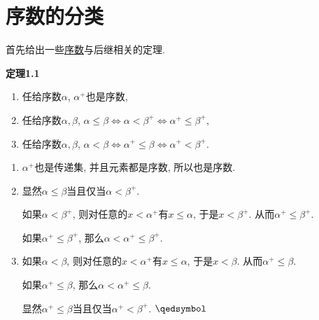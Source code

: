 \documentclass[UTF8]{ctexart}
\begin{document}
\setlength{\abovedisplayskip}{1pt}
\setlength{\belowdisplayskip}{1pt}

\section{序数的分类}

首先给出一些\href{01 序数#nameddest=sec:定义1.1}{序数}与后继相关的定理.

\vspace{10pt}

\hypertarget{sec:定理1.1}{}
\noindent\textbf{定理1.1}

\begin{enumerate}
    \item 任给序数$\alpha$, $\alpha^+$也是序数,
    \item 任给序数$\alpha,\beta$,
    $\alpha\leqslant\beta\iff\alpha<\beta^+\iff\alpha^+\leqslant\beta^+$,
    \item 任给序数$\alpha,\beta$,
    $\alpha<\beta\iff\alpha^+\leqslant\beta\iff\alpha^+<\beta^+$.
\end{enumerate}


\begin{enumerate}
    \item $\alpha^+$也是传递集, 并且元素都是序数, 所以也是序数.
    
    \item 显然$\alpha\leqslant\beta$当且仅当$\alpha<\beta^+$.

    \hspace{2.17em}
    如果$\alpha<\beta^+$, 则对任意的$x<\alpha^+$有$x\leqslant\alpha$,
    于是$x<\beta^+$. 从而$\alpha^+\leqslant\beta^+$.

    \hspace{2.17em}
    如果$\alpha^+\leqslant\beta^+$, 那么$\alpha<\alpha^+\leqslant\beta^+$.

    \item 如果$\alpha<\beta$, 则对任意的$x<\alpha^+$有$x\leqslant\alpha$,
    于是$x<\beta$. 从而$\alpha^+\leqslant\beta$.

    \hspace{2.17em}
    如果$\alpha^+\leqslant\beta$, 那么$\alpha<\alpha^+\leqslant\beta$.

    \hspace{2.17em}
    显然$\alpha^+\leqslant\beta$当且仅当$\alpha^+<\beta^+$. \hfill $\qedsymbol$
\end{enumerate}

\vspace{10pt}
\end{document}
